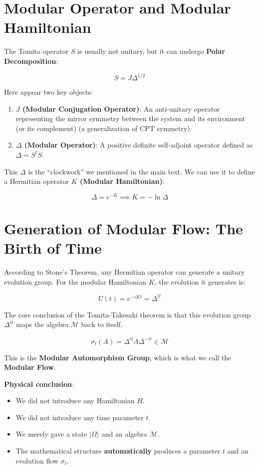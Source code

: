 \section{Modular Operator and Modular Hamiltonian}

The Tomita operator $S$ is usually not unitary, but it can undergo \textbf{Polar Decomposition}:

$$S = J \Delta^{1/2}$$

Here appear two key objects:

\begin{enumerate}
\item \textbf{$J$ (Modular Conjugation Operator)}: An anti-unitary operator representing the mirror symmetry between the system and its environment (or its complement) (a generalization of CPT symmetry).

\item \textbf{$\Delta$ (Modular Operator)}: A positive definite self-adjoint operator defined as $\Delta = S^\dagger S$.
\end{enumerate}

This $\Delta$ is the ``clockwork'' we mentioned in the main text. We can use it to define a Hermitian operator \textbf{$K$ (Modular Hamiltonian)}:

$$\Delta = e^{-K} \implies K = -\ln \Delta$$

\section{Generation of Modular Flow: The Birth of Time}

According to Stone's Theorem, any Hermitian operator can generate a unitary evolution group. For the modular Hamiltonian $K$, the evolution it generates is:

$$U(t) = e^{-iKt} = \Delta^{it}$$

The core conclusion of the Tomita-Takesaki theorem is that this evolution group $\Delta^{it}$ maps the algebra $\mathcal{M}$ back to itself.

$$\sigma_t(A) = \Delta^{it} A \Delta^{-it} \in \mathcal{M}$$

This is the \textbf{Modular Automorphism Group}, which is what we call the \textbf{Modular Flow}.

\textbf{Physical conclusion}:

\begin{itemize}
\item We did not introduce any Hamiltonian $H$.

\item We did not introduce any time parameter $t$.

\item We merely gave a state $|\Omega\rangle$ and an algebra $\mathcal{M}$.

\item The mathematical structure \textbf{automatically} produces a parameter $t$ and an evolution flow $\sigma_t$.
\end{itemize}

